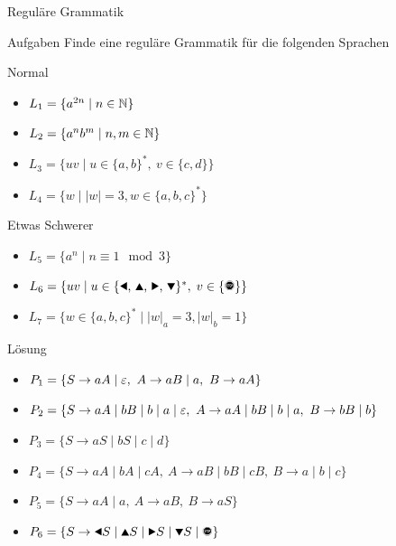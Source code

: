 \documentclass[10pt]{beamer}
\begin{document}
{
\begin{frame}{Reguläre Grammatik}
    \begin{alertblock}{Aufgaben}
    Finde eine reguläre Grammatik für die folgenden Sprachen
    \end{alertblock}
    \begin{block}{Normal}
    \begin{itemize}
        \item $L_1 = \{a^{2n} \mid n\in\mathbb{N}\}$
        \item $L_2 = \{a^nb^m \mid n, m\in\mathbb{N}\}$
        \item $L_3 = \{uv \mid u\in\{a,b\}^\ast,\ v\in\{c,d\}\}$
        \item $L_4 = \{w \mid |w| = 3, w\in \{a,b,c\}^*\}$
    \end{itemize}
    \end{block}
    \begin{block}{Etwas Schwerer}
    \begin{itemize}
        \item $L_5 = \{a^n \mid n \equiv 1 \mod 3\}$
        \item $L_6 = \{uv\mid u\in\{\text{\Rewind, \MoveUp, \Forward, \MoveDown}\}^\ast,\;v\in\{\text{\Stopsign}\}\}$
        \item $L_7 = \{w \in \{a,b,c\}^* \mid |w|_a = 3, |w|_b = 1\}$
    \end{itemize}
    \end{block}
\end{frame}
}

{
\begin{frame}{Lösung}
    \begin{itemize}
        \item<1-> \alert<1>{$P_1 = \{S \to aA \mid \varepsilon,\ A \to aB \mid a,\ B \to aA\}$}
        \item<2-> \alert<2>{$P_2 = \{S \to aA \mid bB \mid b \mid a \mid \varepsilon,\ A \to aA \mid bB \mid b \mid a ,\ B \to bB \mid b\}$}
        \item<3-> \alert<3>{$P_3 = \{S \to aS \mid bS \mid c \mid d\}$}
        \item<4-> \alert<4>{$P_4 = \{S \to aA \mid bA \mid cA,\ A \to aB \mid bB \mid cB,\ B \to a \mid b \mid c\}$}
        \item<5-> \alert<5>{$P_5 = \{S \to aA \mid a,\ A \to aB,\ B \to aS\}$}
        \item<6-> \alert<6>{$P_6 = \{S \to \text{\Rewind}S \mid \text{\MoveUp}S \mid \text{\Forward}S \mid \text{\MoveDown}S \mid \text{\Stopsign}\}$}
    \end{itemize}
\end{frame}
}
\end{document}
